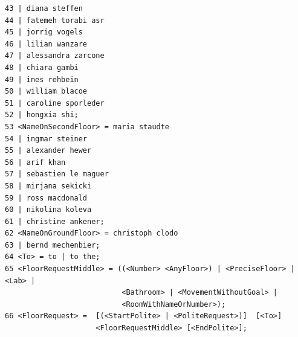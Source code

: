 \documentclass[a4paper, 12pt]{article}
\begin{document}
\begin{verbatim}
43 | diana steffen
44 | fatemeh torabi asr
45 | jorrig vogels
46 | lilian wanzare
47 | alessandra zarcone
48 | chiara gambi
49 | ines rehbein
50 | william blacoe
51 | caroline sporleder
52 | hongxia shi;
53 <NameOnSecondFloor> = maria staudte
54 | ingmar steiner
55 | alexander hewer
56 | arif khan
57 | sebastien le maguer
58 | mirjana sekicki
59 | ross macdonald
60 | nikolina koleva
61 | christine ankener;
62 <NameOnGroundFloor> = christoph clodo
63 | bernd mechenbier;
64 <To> = to | to the;
65 <FloorRequestMiddle> = ((<Number> <AnyFloor>) | <PreciseFloor> | <Lab> |
                           <Bathroom> | <MovementWithoutGoal> |
                           <RoomWithNameOrNumber>);
66 <FloorRequest> =  [(<StartPolite> | <PoliteRequest>)]  [<To>]
                     <FloorRequestMiddle> [<EndPolite>];
\end{verbatim}

\cleardoublepage


\end{document}
